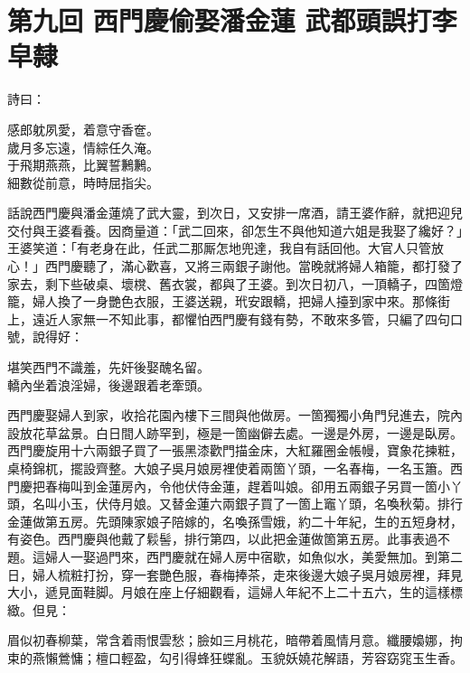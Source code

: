 
\chapter*{第九回 西門慶偷娶潘金蓮 武都頭誤打李皁隸}


詩曰：

\begin{myquote}
感郎躭夙愛，着意守香奩。\\歲月多忘遠，情綜任久淹。\\于飛期燕燕，比翼誓鶼鶼。\\細數從前意，時時屈指尖。
\end{myquote}

話說西門慶與潘金蓮燒了武大靈，到次日，又安排一席酒，請王婆作辭，就把迎兒交付與王婆看養。因商量道：「武二回來，卻怎生不與他知道六姐是我娶了纔好？」王婆笑道：「有老身在此，任武二那厮怎地兜達，我自有話回他。大官人只管放心！」西門慶聽了，滿心歡喜，又將三兩銀子謝他。當晚就將婦人箱籠，都打發了家去，剩下些破桌、壞櫈、舊衣裳，都與了王婆。到次日初八，一頂轎子，四箇燈籠，婦人換了一身艷色衣服，王婆送親，玳安跟轎，把婦人擡到家中來。那條街上，遠近人家無一不知此事，都懼怕西門慶有錢有勢，不敢來多管，只編了四句口號，說得好：

\begin{myquote}
堪笑西門不識羞，先奸後娶醜名留。\\轎內坐着浪淫婦，後邊跟着老牽頭。
\end{myquote}

西門慶娶婦人到家，收拾花園內樓下三間與他做房。一箇獨獨小角門兒進去，院內設放花草盆景。白日間人跡罕到，極是一箇幽僻去處。一邊是外房，一邊是臥房。西門慶旋用十六兩銀子買了一張黑漆歡門描金床，大紅羅圈金帳幔，寶象花揀粧，桌椅錦杌，擺設齊整。大娘子吳月娘房裡使着兩箇丫頭，一名春梅，一名玉簫。西門慶把春梅叫到金蓮房內，令他伏侍金蓮，趕着叫娘。卻用五兩銀子另買一箇小丫頭，名叫小玉，伏侍月娘。又替金蓮六兩銀子買了一箇上竈丫頭，名喚秋菊。排行金蓮做第五房。先頭陳家娘子陪嫁的，名喚孫雪娥，約二十年紀，生的五短身材，有姿色。西門慶與他戴了鬏髻，排行第四，以此把金蓮做箇第五房。此事表過不題。這婦人一娶過門來，西門慶就在婦人房中宿歇，如魚似水，美愛無加。到第二日，婦人梳粧打扮，穿一套艷色服，春梅捧茶，走來後邊大娘子吳月娘房裡，拜見大小，遞見面鞋脚。月娘在座上仔細觀看，這婦人年紀不上二十五六，生的這樣標緻。但見：

\begin{myquote}
眉似初春柳葉，常含着雨恨雲愁；臉如三月桃花，暗帶着風情月意。纖腰嬝娜，拘束的燕懶鶯慵；檀口輕盈，勾引得蜂狂蝶亂。玉貌妖嬈花解語，芳容窈窕玉生香。
\end{myquote}

